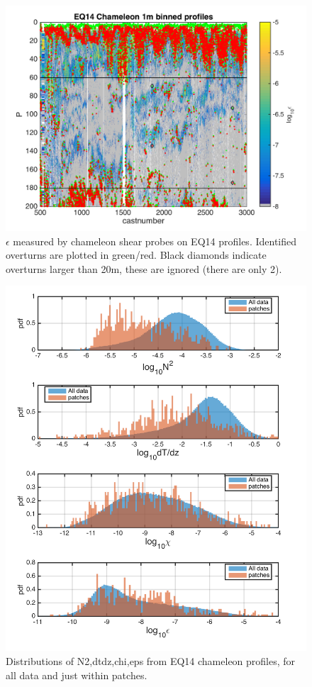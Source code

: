 \documentclass[11pt]{article}
\begin{document}
\begin{figure}[htbp]
\includegraphics[scale=0.8]{GamByPatch_eps_pcolor_wpatches.png}
\caption{$\epsilon$ measured by chameleon shear probes on EQ14 profiles. Identified overturns are plotted in green/red. Black diamonds indicate overturns larger than 20m, these are ignored (there are only 2).}
\label{epswot}
\end{figure}

\begin{figure}[htbp]
\includegraphics[scale=0.8]{hists_allVspatch.png}
\caption{Distributions of N2,dtdz,chi,eps from EQ14 chameleon profiles, for all data and just within patches.}
\label{hists_allVspatch}
\end{figure}
\end{document}
